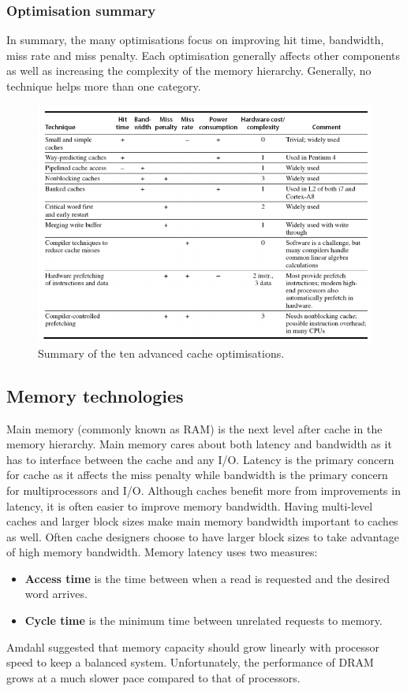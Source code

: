 \documentclass[11pt]{article}
\begin{document}
\subsubsection{Optimisation summary}
In summary, the many optimisations focus on improving hit time, bandwidth, miss rate and miss penalty. Each optimisation generally affects other components as well as increasing the complexity of the memory hierarchy. Generally, no technique helps more than one category.
\begin{figure}[H]
  \centering
  \includegraphics[width=1\textwidth, keepaspectratio]{imgs/cache-optimisation-summary.png}
  \caption{Summary of the ten advanced cache optimisations.}
\end{figure}

\subsection{Memory technologies}
Main memory (commonly known as RAM) is the next level after cache in the memory hierarchy. Main memory cares about both latency and bandwidth as it has to interface between the cache and any I/O. Latency is the primary concern for cache as it affects the miss penalty while bandwidth is the primary concern for multiprocessors and I/O. Although caches benefit more from improvements in latency, it is often easier to improve memory bandwidth. Having multi-level caches and larger block sizes make main memory bandwidth important to caches as well. Often cache designers choose to have larger block sizes to take advantage of high memory bandwidth.
\n
Memory latency uses two measures:
\begin{itemize}
\item \textbf{Access time} is the time between when a read is requested and the desired word arrives.
\item \textbf{Cycle time} is the minimum time between unrelated requests to memory.
\end{itemize}
\noindent
Amdahl suggested that memory capacity should grow linearly with processor speed to keep a balanced system. Unfortunately, the performance of DRAM grows at a much slower pace compared to that of processors. 
\end{document}
